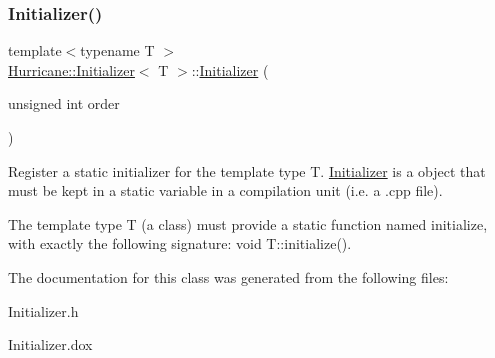 \subsubsection{\texorpdfstring{Initializer()}{Initializer()}}
{\footnotesize\ttfamily template$<$typename T $>$ \\
\mbox{\hyperlink{classHurricane_1_1Initializer}{Hurricane\+::\+Initializer}}$<$ T $>$\+::\mbox{\hyperlink{classHurricane_1_1Initializer}{Initializer}} (\begin{DoxyParamCaption}\item[{unsigned int}]{order }\end{DoxyParamCaption})\hspace{0.3cm}{\ttfamily [inline]}}

Register a static initializer for the template type {\ttfamily T}. \mbox{\hyperlink{classHurricane_1_1Initializer}{Initializer}} is a object that must be kept in a {\ttfamily static} variable in a compilation unit (i.\+e. a {\ttfamily }.cpp file).

The template type {\ttfamily T} (a class) must provide a static function named {\ttfamily initialize}, with exactly the following signature\+: {\ttfamily void T\+::initialize()}. 

The documentation for this class was generated from the following files\+:\begin{DoxyCompactItemize}
\item 
Initializer.\+h\item 
Initializer.\+dox\end{DoxyCompactItemize}
